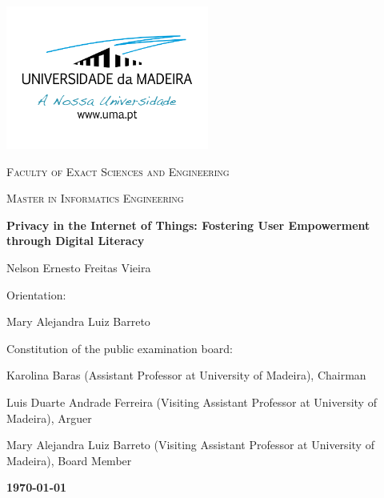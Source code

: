 %
%
\begin{titlepage}
    \centering
    \addtolength{\hoffset}{0.5cm}
    \centering
    \includegraphics[width=0.50\textwidth]{assets/images/uma_logo.png}\par\vspace{0.5cm}
    {\scshape\LARGE {} Faculty of Exact Sciences and Engineering \par}
    \vspace{1cm}
    {\scshape\Large Master in Informatics Engineering \par}
    \vspace{1.5cm}
    {\huge\bfseries Privacy in the Internet of Things: Fostering User Empowerment through Digital Literacy \par}
    \vspace{2cm}
    {\Large Nelson Ernesto Freitas Vieira\par}
    \vfill
    {\large Orientation: \par}
        Mary Alejandra Luiz Barreto\par
    \vfill
    {\large Constitution of the public examination board: \par}
        Karolina Baras (Assistant Professor at University of Madeira), Chairman \par
        Luis Duarte Andrade Ferreira (Visiting Assistant Professor at University of Madeira), Arguer \par
        Mary Alejandra Luiz Barreto (Visiting Assistant Professor at University of Madeira), Board Member \par
    \vfill
    {\large \bfseries \today \par}
\end{titlepage}

